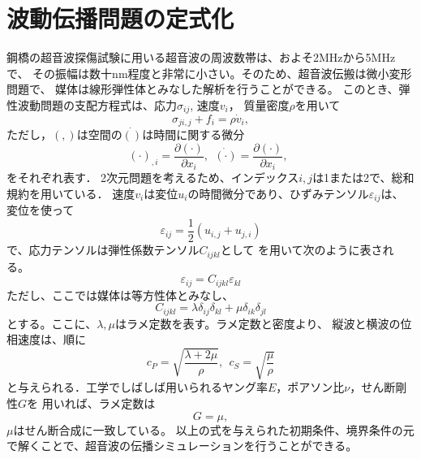 \section{波動伝播問題の定式化}
鋼橋の超音波探傷試験に用いる超音波の周波数帯は、およそ2MHzから5MHzで、
その振幅は数十nm程度と非常に小さい。そのため、超音波伝搬は微小変形問題で、
媒体は線形弾性体とみなした解析を行うことができる。
このとき、弾性波動問題の支配方程式は、応力$\sigma_{ij}$, 速度$v_i$，
質量密度$\rho$を用いて
\begin{equation}
	\sigma_{ji,j}+f_i=\rho \dot{v}_i,
	\label{eqn:}
\end{equation}
ただし，$(,)$は空間の$\dot{()}$は時間に関する微分
\begin{equation}
	(\cdot)_{,i}=\frac{\partial (\cdot)}{\partial x_i}, \ \ 
	\dot{(\cdot)}=\frac{\partial (\cdot)}{\partial x_i}, \ \ 
	\label{eqn:}
\end{equation}
をそれぞれ表す．
2次元問題を考えるため、インデックス$i,j$は1または2で、総和規約を用いている．
速度$v_i$は変位$u_i$の時間微分であり、ひずみテンソル$\varepsilon_{ij}$は、
変位を使って
\begin{equation}
	\varepsilon_{ij}=\frac{1}{2}(u_{i,j}+u_{j,i})
	\label{eqn:}
\end{equation}
で、応力テンソルは弾性係数テンソル$C_{ijkl}$として
を用いて次のように表される。
\begin{equation}
	\varepsilon_{ij}=C_{ijkl}\varepsilon_{kl}
	\label{eqn:}
\end{equation}
ただし、ここでは媒体は等方性体とみなし、
\begin{equation}
	C_{ijkl}=\lambda \delta_{ij}\delta_{kl} +\mu \delta_{ik}\delta_{jl}
	\label{eqn:}
\end{equation}
とする。ここに、$\lambda, \mu$はラメ定数を表す。ラメ定数と密度より、
縦波と横波の位相速度は、順に
\begin{equation}
	c_{P}=\sqrt{\frac{\lambda + 2\mu}{\rho}}
	, \ \ 
	c_{S}=\sqrt{\frac{\mu}{\rho}}
	\label{eqn:}
\end{equation}
と与えられる．工学でしばしば用いられるヤング率$E$，ポアソン比$\nu$，せん断剛性$G$を
用いれば、ラメ定数は
\begin{equation}
	G=\mu, 
	\label{eqn:}
\end{equation}
$\mu$はせん断合成に一致している。
以上の式を与えられた初期条件、境界条件の元で解くことで、超音波の伝播シミュレーションを行うことができる。
